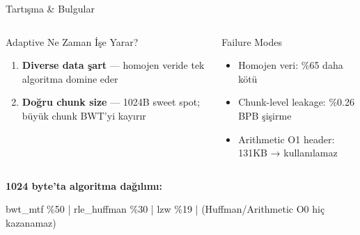 \documentclass[10pt,aspectratio=43]{beamer}
\begin{document}
\begin{frame}{Tartışma \& Bulgular}
  \begin{columns}[T]
    \begin{exampleblock}{Adaptive Ne Zaman İşe Yarar?}
      \begin{enumerate}
        \setlength{\itemsep}{0.3em}
        \item \textbf{Diverse data şart} — homojen veride tek algoritma domine eder
        \item \textbf{Doğru chunk size} — 1024B sweet spot; büyük chunk BWT'yi kayırır
      \end{enumerate}
    \end{exampleblock}

    \begin{alertblock}{Failure Modes}
      \begin{itemize}
        \setlength{\itemsep}{0.3em}
        \item Homojen veri: \%65 daha kötü
        \item Chunk-level leakage: \%0.26 BPB şişirme
        \item Arithmetic O1 header: 131KB → kullanılamaz
      \end{itemize}
    \end{alertblock}
  \end{columns}

  \vspace{0.5em}
  \textbf{1024 byte'ta algoritma dağılımı:}
  \vspace{0.3em}
  \begin{center}
    bwt\_mtf \%50 | rle\_huffman \%30 | lzw \%19 | \small (Huffman/Arithmetic O0 hiç kazanamaz)
  \end{center}
\end{frame}
\end{document}
